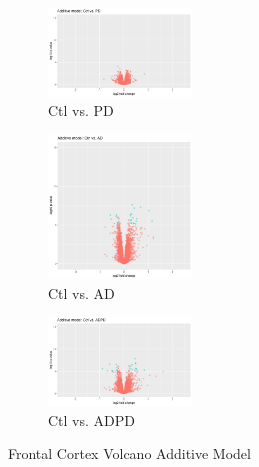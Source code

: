 \begin{figure}
\begin{subfigure}[b]{0.33\linewidth}
\centering
\includegraphics[width=1.5in]{./Figures/volcano/FrontalCortex_Volcano_AdditiveModel_CtrlvsPD.png}
\caption{Ctl vs. PD}
\end{subfigure}%
\begin{subfigure}[b]{0.33\linewidth}
\centering
\includegraphics[width=1.5in]{./Figures/volcano/FrontalCortex_Volcano_AdditiveModel_CtrlvsAD.png}
\caption{Ctl vs. AD}
\end{subfigure}%
\begin{subfigure}[b]{0.33\linewidth}
\centering
\includegraphics[width=1.5in]{./Figures/volcano/FrontalCortex_Volcano_AdditiveModel_CtrlvsADPD.png}
\caption{Ctl vs. ADPD}
\end{subfigure}
\caption{\label{FCvolcano} Frontal Cortex Volcano Additive Model}
\end{figure}

